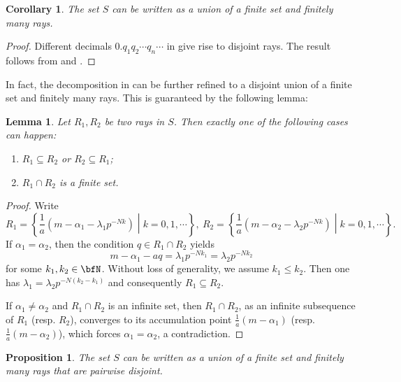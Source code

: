 \documentclass[english,oneside]{smfart}
\newtheorem{lemma}[theorem]{Lemma}
\newtheorem{proposition}[theorem]{Proposition}
\newtheorem{corollary}[theorem]{Corollary}
\begin{document}
\begin{corollary}\label{coro:8081}
    The set $S$ can be written as a union of a finite set and finitely many rays.
\end{corollary}
\begin{proof}
    Different decimals $0.q_1q_2\cdots q_n\cdots$ in  give rise to disjoint rays. The result follows from  and .
\end{proof}
In fact, the decomposition in  can be further refined to a disjoint union of a finite set and finitely many rays. This is guaranteed by the following lemma:
\begin{lemma}\label{lem:59667}
    Let $R_1, R_2$ be two rays in $S$. Then exactly one of the following cases can happen:
    \begin{enumerate}
        \item $R_1\subseteq R_2$ or $R_2\subseteq R_1$;
        \item $R_1\cap R_2$ is a finite set.
    \end{enumerate}
\end{lemma}
\begin{proof}
    Write
    $$R_1=\left\{\frac{1}{a}\left(m-\alpha_1-\lambda_1 p^{-Nk}\right)\middle\vert k=0,1,\cdots\right\},\ R_2=\left\{\frac{1}{a}\left(m-\alpha_2-\lambda_2 p^{-Nk}\right)\middle\vert k=0,1,\cdots\right\}.$$
    If $\alpha_1=\alpha_2$, then the condition $q\in R_1\cap R_2$ yields $$m-\alpha_1-aq=\lambda_1 p^{-Nk_1}=\lambda_2 p^{-Nk_2}$$
    for some $k_1,k_2\in\bfN$. Without loss of generality, we assume $k_1\leq k_2$. Then one has $\lambda_1 = \lambda_2 p^{-N(k_2-k_1)}$ and consequently $R_1\subseteq R_2$.

    If $\alpha_1\neq \alpha_2$ and $R_1\cap R_2$ is an infinite set, then $R_1\cap R_2$, as an infinite subsequence of $R_1$ (resp. $R_2$), converges to its accumulation point $\frac{1}{a}(m-\alpha_1)$ (resp. $\frac{1}{a}(m-\alpha_2)$), which forces $\alpha_1=\alpha_2$, a contradiction.
\end{proof}
\begin{proposition}\label{prop:29055}
    The set $S$ can be written as a union of a finite set and finitely many rays that are pairwise disjoint.
\end{proposition}
\end{document}
